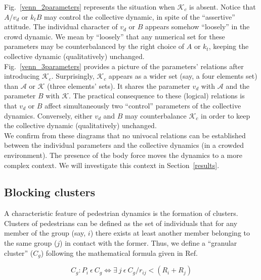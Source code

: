 \documentclass[preprint,12pt]{elsarticle}
\begin{document}
Fig.~\ref{venn_2parameters} represents the situation when $\mathcal{K}_c$ is
absent. Notice that $A/v_d$ or $k_t B$ may control the collective  dynamic, in
spite of the ``assertive'' attitude. The individual character of  $v_d$ or $B$
appears somehow ``loosely'' in the crowd dynamic. We mean by  ``loosely'' that
any numerical set for these parameters may be  counterbalanced by the right
choice of $A$ or $k_t$, keeping the  collective dynamic (qualitatively)
unchanged.  \\

Fig.~\ref{venn_3parameters} provides a picture of the parameters' relations
after introducing $\mathcal{K}_c$. Surprisingly, $\mathcal{K}_c$ appears as a
wider set (say, a four elements set) than $\mathcal{A}$ or $\mathcal{K}$ (three
elements' sets). It shares the parameter $v_d$ with $\mathcal{A}$ and the
parameter $B$ with $\mathcal{K}$. The practical consequence to these (logical)
relations is that $v_d$ or $B$ affect simultaneously two ``control'' parameters
of the collective dynamics. Conversely, either $v_d$ and $B$ may counterbalance
$\mathcal{K}_c$ in order to keep the collective dynamic (qualitatively)
unchanged.  \\

We confirm from these diagrams that no univocal relations can be established
between the individual parameters and the collective dynamics (in a crowded
environment). The presence of the body force moves the dynamics to a more
complex context. We will investigate this context in Section~\ref{results}. \\


\subsection{\label{blocking_clusters} Blocking clusters}

A characteristic feature of pedestrian dynamics is the formation of clusters.
Clusters of pedestrians can  be defined as the set of individuals that for any
member of the group (say, $i$) there exists at least another member belonging to
the same group ($j$) in contact with the former.  Thus, we define a ``granular
cluster'' ($C_g$) following the mathematical formula given in
Ref.~\cite{strachan1997fragment}

\begin{equation}
C_g:P_i~\epsilon~ C_g \Leftrightarrow \exists~ j~\epsilon~C_g / r_{ij} 
< (R_i+R_j) \label{ec-cluster}
\end{equation}
\end{document}
